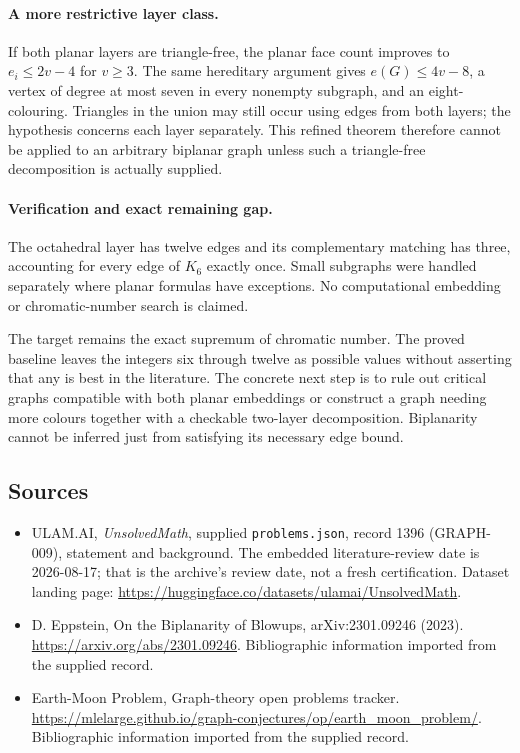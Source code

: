 \documentclass[11pt,a4paper]{article}
\begin{document}
\paragraph{A more restrictive layer class.}
If both planar layers are triangle-free, the planar face count improves to $e_i\le2v-4$ for $v\ge3$. The same hereditary argument gives $e(G)\le4v-8$, a vertex of degree at most seven in every nonempty subgraph, and an eight-colouring. Triangles in the union may still occur using edges from both layers; the hypothesis concerns each layer separately. This refined theorem therefore cannot be applied to an arbitrary biplanar graph unless such a triangle-free decomposition is actually supplied.

\paragraph{Verification and exact remaining gap.}
The octahedral layer has twelve edges and its complementary matching has three, accounting for every edge of $K_6$ exactly once. Small subgraphs were handled separately where planar formulas have exceptions. No computational embedding or chromatic-number search is claimed.

The target remains the exact supremum of chromatic number. The proved baseline leaves the integers six through twelve as possible values without asserting that any is best in the literature. The concrete next step is to rule out critical graphs compatible with both planar embeddings or construct a graph needing more colours together with a checkable two-layer decomposition. Biplanarity cannot be inferred just from satisfying its necessary edge bound.

\subsection{Sources}

{\small

\begin{itemize}

\item[\hypertarget{source:1396:1}{S1}] ULAM.AI, \emph{UnsolvedMath}, supplied \texttt{problems.json}, record 1396 (GRAPH-009), statement and background. The embedded literature-review date is 2026-08-17; that is the archive’s review date, not a fresh certification. Dataset landing page: \url{https://huggingface.co/datasets/ulamai/UnsolvedMath}.

\item[\hypertarget{source:1396:2}{S2}] D. Eppstein, On the Biplanarity of Blowups, arXiv:2301.09246 (2023). \url{https://arxiv.org/abs/2301.09246}. Bibliographic information imported from the supplied record.

\item[\hypertarget{source:1396:3}{S3}] Earth-Moon Problem, Graph-theory open problems tracker. \url{https://mlelarge.github.io/graph-conjectures/op/earth_moon_problem/}. Bibliographic information imported from the supplied record.

\end{itemize}

}

\label{end:1396}
\end{document}

